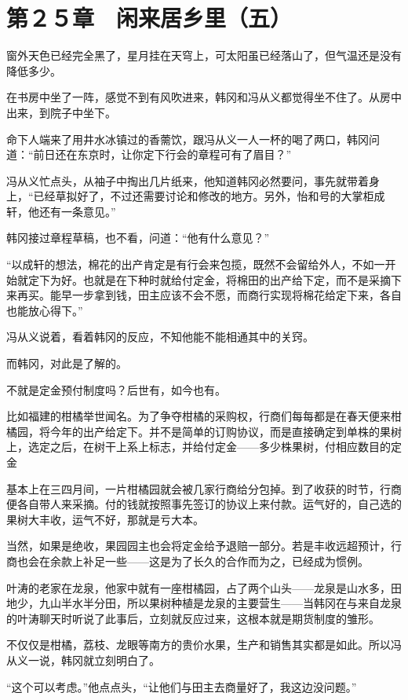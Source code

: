 \section{第２５章　闲来居乡里（五）}

窗外天色已经完全黑了，星月挂在天穹上，可太阳虽已经落山了，但气温还是没有降低多少。

在书房中坐了一阵，感觉不到有风吹进来，韩冈和冯从义都觉得坐不住了。从房中出来，到院子中坐下。

命下人端来了用井水冰镇过的香薷饮，跟冯从义一人一杯的喝了两口，韩冈问道：“前日还在东京时，让你定下行会的章程可有了眉目？”

冯从义忙点头，从袖子中掏出几片纸来，他知道韩冈必然要问，事先就带着身上，“已经草拟好了，不过还需要讨论和修改的地方。另外，怡和号的大掌柜成轩，他还有一条意见。”

韩冈接过章程草稿，也不看，问道：“他有什么意见？”

“以成轩的想法，棉花的出产肯定是有行会来包揽，既然不会留给外人，不如一开始就定下为好。也就是在下种时就给付定金，将棉田的出产给下定，而不是采摘下来再买。能早一步拿到钱，田主应该不会不愿，而商行实现将棉花给定下来，各自也能放心得下。”

冯从义说着，看着韩冈的反应，不知他能不能相通其中的关窍。

而韩冈，对此是了解的。

不就是定金预付制度吗？后世有，如今也有。

比如福建的柑橘举世闻名。为了争夺柑橘的采购权，行商们每每都是在春天便来柑橘园，将今年的出产给定下。并不是简单的订购协议，而是直接确定到单株的果树上，选定之后，在树干上系上标志，并给付定金——多少株果树，付相应数目的定金

基本上在三四月间，一片柑橘园就会被几家行商给分包掉。到了收获的时节，行商便各自带人来采摘。付的钱就按照事先签订的协议上来付款。运气好的，自己选的果树大丰收，运气不好，那就是亏大本。

当然，如果是绝收，果园园主也会将定金给予退赔一部分。若是丰收远超预计，行商也会在余款上补足一些——这是为了长久的合作而为之，已经成为惯例。

叶涛的老家在龙泉，他家中就有一座柑橘园，占了两个山头——龙泉是山水多，田地少，九山半水半分田，所以果树种植是龙泉的主要营生——当韩冈在与来自龙泉的叶涛聊天时听说了此事后，立刻就反应过来，这根本就是期货制度的雏形。

不仅仅是柑橘，荔枝、龙眼等南方的贵价水果，生产和销售其实都是如此。所以冯从义一说，韩冈就立刻明白了。

“这个可以考虑。”他点点头，“让他们与田主去商量好了，我这边没问题。”

